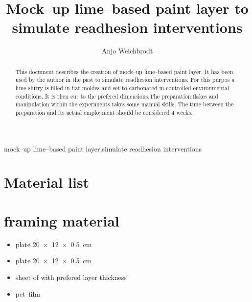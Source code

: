 \documentclass[review]{elsarticle}
\begin{document}
\begin{frontmatter}

\title{Mock--up lime--based paint layer to simulate readhesion interventions}

\author{Anjo Weichbrodt}

\address{Rue Jean Grimoux 8, 1700 Fribourg}

%
%

\begin{abstract}
This document describes the creation of mock--up lime--based paint layer. It has been used by the author in the past to simulate readhesion interventions. For this purpos a lime slurry is filled in flat moldes and set to carbonated in controlled environmental conditions. It is then cut to the prefered dimensions.The preparation flakes and manipulation within the experiments takes some manual skills. The time between the preparation and its actual employment should be considered 4 weeks.
\end{abstract}

\begin{keyword}
{mock--up lime--based paint layer}\sep{simulate readhesion interventions}
\end{keyword}

\end{frontmatter}

\linenumbers{}


\section{Material list}



\section{framing material}
\begin{itemize}
  \item {} plate \SI[product-units = single]{20 x 12 x 0.5}{\cm}
  \item {} plate \SI[product-units = single]{20 x 12 x 0.5}{\cm}
  \item sheet of  with prefered layer thickness
  \item  \gls{pet}--film

\end{itemize}
\end{document}
